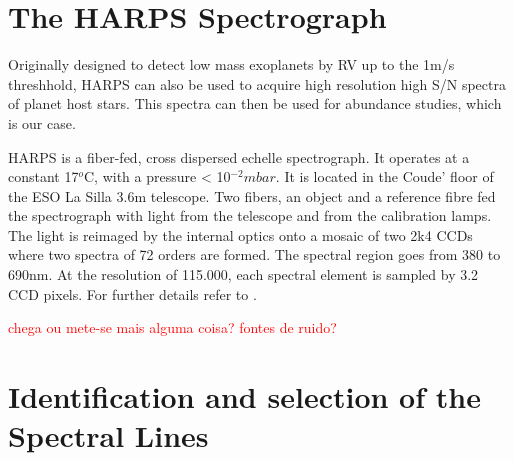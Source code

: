 \documentclass[dvips,12pt,a4paper]{report}
\begin{document}
{\section {The HARPS Spectrograph}

Originally designed to detect low mass exoplanets by RV up to the  1m/s threshhold, HARPS can also be used to acquire high resolution high S/N spectra of planet host stars. This spectra can then be used for abundance studies, which is our case. 

HARPS is a fiber-fed, cross dispersed echelle spectrograph. It operates at a constant 17$^o$C, with a pressure < 10$^{-2}mbar$. It is located in the Coude' floor of the ESO La Silla 3.6m telescope. Two fibers, an object and a reference fibre fed the spectrograph with light from the telescope and from the calibration lamps. The light is reimaged by the internal optics onto a mosaic of two 2k4 CCDs where two spectra of 72 orders are formed. The spectral region goes from 380 to 690nm. At the resolution of 115.000, each spectral element is sampled by 3.2 CCD pixels. For further details refer to \citet{Mayor-2003b}. 

\textcolor{red}{chega ou mete-se mais alguma coisa? fontes de ruido?}





\section {Identification and selection of the Spectral Lines}

}
\end{document}
